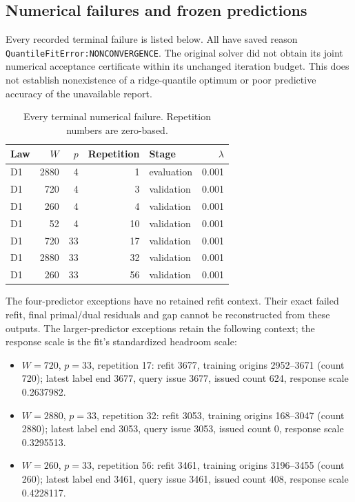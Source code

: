 \endgroup

\subsection{Numerical failures and frozen predictions}\label{sup:v8-mc-failures}

Every recorded terminal failure is listed below. All have saved reason \texttt{QuantileFitError:}\allowbreak\texttt{NONCONVERGENCE}. The original solver did not obtain its joint numerical acceptance certificate within its unchanged iteration budget. This does not establish nonexistence of a ridge-quantile optimum or poor predictive accuracy of the unavailable report.

\begin{table}[htbp]\centering\footnotesize

\caption{Every terminal numerical failure. Repetition numbers are zero-based.}\label{tab:v8-mc-failures}

\begin{tabular}{lrrrlr}\toprule Law & $W$ & $p$ & Repetition & Stage & $\lambda$\\\midrule
D1 & 2880 & 4 & 1 & evaluation & 0.001 \\
D1 & 720 & 4 & 3 & validation & 0.001 \\
D1 & 260 & 4 & 4 & validation & 0.001 \\
D1 & 52 & 4 & 10 & validation & 0.001 \\
D1 & 720 & 33 & 17 & validation & 0.001 \\
D1 & 2880 & 33 & 32 & validation & 0.001 \\
D1 & 260 & 33 & 56 & validation & 0.001 \\
\bottomrule\end{tabular}\end{table}

The four-predictor exceptions have no retained refit context. Their exact failed refit, final primal/dual residuals and gap cannot be reconstructed from these outputs. The larger-predictor exceptions retain the following context; the response scale is the fit's standardized headroom scale:

\begin{itemize}\setlength{\itemsep}{0pt}

\item $W=720$, $p=33$, repetition 17: refit 3677, training origins 2952--3671 (count 720); latest label end 3677, query issue 3677, issued count 624, response scale 0.2637982.

\item $W=2880$, $p=33$, repetition 32: refit 3053, training origins 168--3047 (count 2880); latest label end 3053, query issue 3053, issued count 0, response scale 0.3295513.

\item $W=260$, $p=33$, repetition 56: refit 3461, training origins 3196--3455 (count 260); latest label end 3461, query issue 3461, issued count 408, response scale 0.4228117.

\end{itemize}

